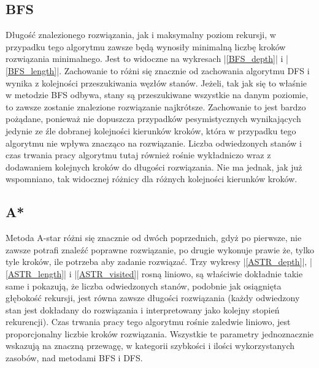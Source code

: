 \documentclass{classrep}
\begin{document}
{        \subsection{BFS} {
            Długość znalezionego rozwiązania, jak i maksymalny poziom rekursji, w przypadku tego
            algorytmu zawsze będą wynosiły minimalną liczbę kroków rozwiązania minimalnego. Jest
            to widoczne na wykresach |\ref{BFS_depth}| i |\ref{BFS_length}|. Zachowanie to różni się znacznie
            od zachowania algorytmu DFS i wynika z kolejności przeszukiwania węzłów stanów. Jeżeli,
            tak jak się to właśnie w metodzie BFS odbywa, stany są przeszukiwane wszystkie na danym
            poziomie, to zawsze zostanie znalezione rozwiązanie najkrótsze. Zachowanie to jest
            bardzo pożądane, ponieważ nie dopuszcza przypadków pesymistycznych wynikających jedynie
            ze źle dobranej kolejności kierunków kroków, która w przypadku tego algorytmu nie
            wpływa znacząco na rozwiązanie.
            Liczba odwiedzonych stanów i czas trwania pracy algorytmu tutaj również rośnie
            wykładniczo wraz z dodawaniem kolejnych kroków do długości rozwiązania. Nie ma
            jednak, jak już wspomniano, tak widocznej różnicy dla różnych kolejności kierunków kroków.
        }

        \subsection{A*} {
            Metoda A-star różni się znacznie od dwóch poprzednich, gdyż po pierwsze, nie zawsze
            potrafi znaleźć poprawne rozwiązanie, po drugie wykonuje prawie że, tylko tyle kroków,
            ile potrzeba aby zadanie rozwiązać. Trzy wykresy |\ref{ASTR_depth}|, |\ref{ASTR_length}| i |\ref{ASTR_visited}|
            rosną liniowo, są właściwie dokładnie takie same i pokazują, że liczba odwiedzonych stanów,
            podobnie jak osiągnięta głębokość rekursji, jest równa zawsze długości rozwiązania
            (każdy odwiedzony stan jest dokładany do rozwiązania i interpretowany jako kolejny
            stopień rekurencji). Czas trwania pracy tego algorytmu rośnie zaledwie liniowo, jest
            proporcjonalny liczbie kroków rozwiązania. Wszystkie te parametry jednoznacznie wskazują
            na znaczną przewagę, w kategorii szybkości i ilości wykorzystanych zasobów,
            nad metodami BFS i DFS.

}}
\end{document}
